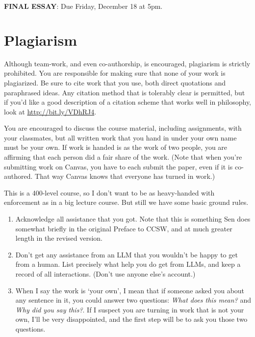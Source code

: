 \documentclass[
  letterpaper,
  DIV=11,
  numbers=noendperiod]{scrartcl}
\newcounter{none} %
\providecommand{\tightlist}{%
  \setlength{\itemsep}{0pt}\setlength{\parskip}{0pt}}
\begin{document}
\textbf{FINAL ESSAY}: Due Friday, December 18 at 5pm.

\newpage

\section{Plagiarism}\label{plagiarism}

Although team-work, and even co-authorship, is encouraged, plagiarism is
strictly prohibited. You are responsible for making sure that none of
your work is plagiarized. Be sure to cite work that you use, both direct
quotations and paraphrased ideas. Any citation method that is tolerably
clear is permitted, but if you'd like a good description of a citation
scheme that works well in philosophy, look at
\url{http://bit.ly/VDhRJ4}.

You are encouraged to discuss the course material, including
assignments, with your classmates, but all written work that you hand in
under your own name must be your own. If work is handed is as the work
of two people, you are affirming that each person did a fair share of
the work. (Note that when you're submitting work on Canvas, you have to
each submit the paper, even if it is co-authored. That way Canvas knows
that everyone has turned in work.)

This is a 400-level course, so I don't want to be as heavy-handed with
enforcement as in a big lecture course. But still we have some basic
ground rules.

\begin{enumerate}
\def\labelenumi{\arabic{enumi}.}
\tightlist
\item
  Acknowledge all assistance that you got. Note that this is something
  Sen does somewhat briefly in the original Preface to CCSW, and at much
  greater length in the revised version.
\item
  Don't get any assistance from an LLM that you wouldn't be happy to get
  from a human. List precisely what help you do get from LLMs, and keep
  a record of all interactions. (Don't use anyone else's account.)
\item
  When I say the work is `your own', I mean that if someone asked you
  about any sentence in it, you could answer two questions: \emph{What
  does this mean?} and \emph{Why did you say this?}. If I suspect you
  are turning in work that is not your own, I'll be very disappointed,
  and the first step will be to ask you those two questions.
\end{enumerate}
\end{document}
